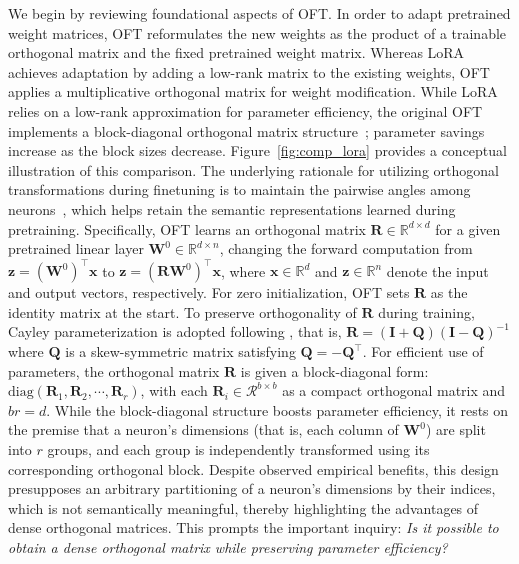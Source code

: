 We begin by reviewing foundational aspects of OFT. In order to adapt pretrained weight matrices, OFT reformulates the new weights as the product of a trainable orthogonal matrix and the fixed pretrained weight matrix. Whereas LoRA achieves adaptation by adding a low-rank matrix to the existing weights, OFT applies a multiplicative orthogonal matrix for weight modification. While LoRA relies on a low-rank approximation for parameter efficiency, the original OFT implements a block-diagonal orthogonal matrix structure~\cite{qiu2023controlling}; parameter savings increase as the block sizes decrease. Figure~\ref{fig:comp_lora} provides a conceptual illustration of this comparison. The underlying rationale for utilizing orthogonal transformations during finetuning is to maintain the pairwise angles among neurons~\cite{liu2018learning,liu2021orthogonal,qiu2023controlling}, which helps retain the semantic representations learned during pretraining. Specifically, OFT learns an orthogonal matrix $\bm{R}\in\mathbb{R}^{d\times d}$ for a given pretrained linear layer $\bm{W}^0\in\mathbb{R}^{d\times n}$, changing the forward computation from $\bm{z}=(\bm{W}^0)^\top\bm{x}$ to $\bm{z}=(\bm{R}\bm{W}^0)^\top\bm{x}$, where $\bm{x}\in\mathbb{R}^{d}$ and $\bm{z}\in\mathbb{R}^{n}$ denote the input and output vectors, respectively. For zero initialization, OFT sets $\bm{R}$ as the identity matrix at the start. To preserve orthogonality of $\bm{R}$ during training, Cayley parameterization is adopted following \cite{qiu2023controlling,liu2021orthogonal}, that is, $\bm{R}=(\bm{I}+\bm{Q})(\bm{I}-\bm{Q})^{-1}$ where $\bm{Q}$ is a skew-symmetric matrix satisfying $\bm{Q}=-\bm{Q}^\top$. For efficient use of parameters, the orthogonal matrix $\bm{R}$ is given a block-diagonal form: $\text{diag}(\bm{R}_1,\bm{R}_2,\cdots,\bm{R}_r)$, with each $\bm{R}_i\in\mathcal{R}^{b\times b}$ as a compact orthogonal matrix and $br=d$. While the block-diagonal structure boosts parameter efficiency, it rests on the premise that a neuron's dimensions (that is, each column of $\bm{W}^0$) are split into $r$ groups, and each group is independently transformed using its corresponding orthogonal block. Despite observed empirical benefits, this design presupposes an arbitrary partitioning of a neuron's dimensions by their indices, which is not semantically meaningful, thereby highlighting the advantages of dense orthogonal matrices. This prompts the important inquiry: \emph{Is it possible to obtain a dense orthogonal matrix while preserving parameter efficiency?}

